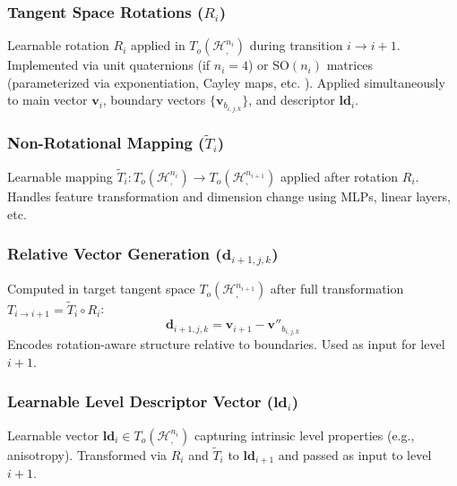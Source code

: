 \documentclass[11pt, twoside]{article} %
\newcommand{\HypSpaceCmd}[3]{\mathcal{H}^{#1}_{#2, #3}} %
\newcommand{\SOcmd}[1]{\text{SO}(#1)} %
\begin{document}
\subsubsection[Tangent Space Rotations (Ri)]{\texorpdfstring{Tangent Space Rotations ($R_i$)}{Tangent Space Rotations (Ri)}}
\label{ssubsec:tangent_rotation}
Learnable rotation $R_i$ applied in $T_o(\HypSpaceCmd{n_i}{}{})$ during transition $i \rightarrow i+1$. Implemented via unit quaternions (if $n_i=4$) or $\SOcmd{n_i}$ matrices (parameterized via exponentiation, Cayley maps, etc. \cite{MhammediEtAl2017}). Applied simultaneously to main vector $\mathbf{v}_i$, boundary vectors $\{\mathbf{v}_{b_{i,j,k}}\}$, and descriptor $\mathbf{ld}_i$.

\subsubsection[Non-Rotational Mapping (Ttilde i)]{\texorpdfstring{Non-Rotational Mapping ($\tilde{T}_i$)}{Non-Rotational Mapping (Ttilde i)}}
\label{ssubsec:nonrot_mapping}
Learnable mapping $\tilde{T}_i: T_o(\HypSpaceCmd{n_i}{}{}) \rightarrow T_o(\HypSpaceCmd{n_{i+1}}{}{})$ applied after rotation $R_i$. Handles feature transformation and dimension change using MLPs, linear layers, etc.

\subsubsection[Relative Vector Generation (d i+1,j,k)]{\texorpdfstring{Relative Vector Generation ($\mathbf{d}_{i+1, j, k}$)}{Relative Vector Generation (d i+1,j,k)}}
\label{ssubsec:relative_vectors}
Computed in target tangent space $T_o(\HypSpaceCmd{n_{i+1}}{}{})$ after full transformation $T_{i \rightarrow i+1} = \tilde{T}_i \circ R_i$:
\begin{equation}
    \mathbf{d}_{i+1, j, k} = \mathbf{v}_{i+1} - \mathbf{v}''_{b_{i,j,k}}
\end{equation}
Encodes rotation-aware structure relative to boundaries. Used as input for level $i+1$.

\subsubsection[Learnable Level Descriptor Vector (ld i)]{\texorpdfstring{Learnable Level Descriptor Vector ($\mathbf{ld}_i$)}{Learnable Level Descriptor Vector (ld i)}}
\label{ssubsec:level_descriptor}
Learnable vector $\mathbf{ld}_i \in T_o(\HypSpaceCmd{n_i}{}{})$ capturing intrinsic level properties (e.g., anisotropy). Transformed via $R_i$ and $\tilde{T}_i$ to $\mathbf{ld}_{i+1}$ and passed as input to level $i+1$.
\end{document}
